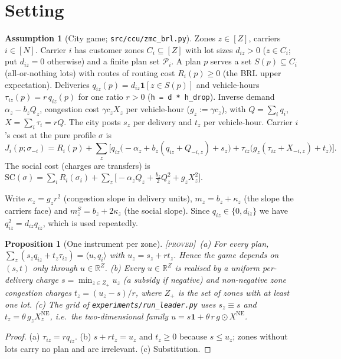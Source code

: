 \documentclass[11pt]{article}
\newtheorem{proposition}[theorem]{Proposition}
\theoremstyle{definition}
\newtheorem{assumption}{Assumption}
\theoremstyle{remark}
\newcommand{\R}{\mathbb{R}}
\newcommand{\cP}{\mathcal{P}}
\newcommand{\ip}[2]{\langle #1,#2\rangle}
\newcommand{\SC}{\mathrm{SC}}
\newcommand{\NE}{\mathrm{NE}}
\newcommand{\PROVED}{{\normalfont\textsc{[proved]}}}
\begin{document}
\section{Setting}\label{sec:setting}

\begin{assumption}[City game; \texttt{src/ccu/zmc\_brl.py}]\label{ass:game}
Zones $z\in[Z]$, carriers $i\in[N]$. Carrier $i$ has customer zones $C_i\subseteq[Z]$ with lot sizes $d_{iz}>0$ ($z\in C_i$; put $d_{iz}=0$ otherwise) and a finite plan set $\cP_i$. A plan $p$ serves a set $S(p)\subseteq C_i$ (all-or-nothing lots) with routes of routing cost $R_i(p)\ge0$ (the BRL upper expectation). Deliveries $q_{iz}(p)=d_{iz}\mathbf 1[z\in S(p)]$ and vehicle-hours $\tau_{iz}(p)=r\,q_{iz}(p)$ for one ratio $r>0$ (\texttt{h = d * h\_drop}). Inverse demand $\alpha_z-b_zQ_z$, congestion cost $\gamma c_z X_z$ per vehicle-hour ($g_z:=\gamma c_z$), with $Q=\sum_iq_i$, $X=\sum_i\tau_i=rQ$. The city posts $s_z$ per delivery and $t_z$ per vehicle-hour. Carrier $i$'s cost at the pure profile $\sigma$ is
\[J_i(p;\sigma_{-i})=R_i(p)+\sum_z\Big[q_{iz}\big(-\alpha_z+b_z(q_{iz}+Q_{-i,z})+s_z\big)+\tau_{iz}\big(g_z(\tau_{iz}+X_{-i,z})+t_z\big)\Big].\]
The social cost (charges are transfers) is
$\SC(\sigma)=\sum_iR_i(\sigma_i)+\sum_z\big[-\alpha_zQ_z+\tfrac{b_z}{2}Q_z^2+g_zX_z^2\big]$.
\end{assumption}

Write $\kappa_z=g_zr^2$ (congestion slope in delivery units), $m_z=b_z+\kappa_z$ (the slope the carriers face) and $m^S_z=b_z+2\kappa_z$ (the social slope). Since $q_{iz}\in\{0,d_{iz}\}$ we have $q_{iz}^2=d_{iz}q_{iz}$, which is used repeatedly.

\begin{proposition}[One instrument per zone]\label{prop:instr}\PROVED\
(a) For every plan, $\sum_z(s_zq_{iz}+t_z\tau_{iz})=\ip{u}{q_i}$ with $u_z=s_z+rt_z$. Hence the game depends on $(s,t)$ only through $u\in\R^Z$.
(b) Every $u\in\R^Z$ is realised by a \emph{uniform} per-delivery charge $s=\min_{z\in Z_+}u_z$ (a subsidy if negative) and non-negative zone congestion charges $t_z=(u_z-s)/r$, where $Z_+$ is the set of zones with at least one lot.
(c) The grid of \texttt{experiments/run\_leader.py} uses $s_z\equiv s$ and $t_z=\theta\,g_zX^{\NE}_z$, i.e.\ the two-dimensional family $u=s\mathbf 1+\theta\, r\,g\odot X^{\NE}$.
\end{proposition}
\begin{proof}
(a) $\tau_{iz}=rq_{iz}$. (b) $s+rt_z=u_z$ and $t_z\ge0$ because $s\le u_z$; zones without lots carry no plan and are irrelevant. (c) Substitution.
\end{proof}
\end{document}

